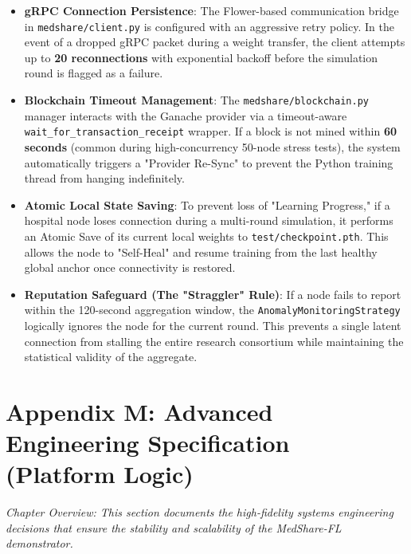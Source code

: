 \documentclass[10pt, a4paper, twocolumn]{article}
\begin{document}
\begin{itemize}[leftmargin=1.5em]
    \item \textbf{gRPC Connection Persistence}: The Flower-based communication bridge in \texttt{medshare/client.py} is configured with an aggressive retry policy. In the event of a dropped gRPC packet during a weight transfer, the client attempts up to \textbf{20 reconnections} with exponential backoff before the simulation round is flagged as a failure.
    \item \textbf{Blockchain Timeout Management}: The \texttt{medshare/blockchain.py} manager interacts with the Ganache provider via a timeout-aware \texttt{wait\_for\_transaction\_receipt} wrapper. If a block is not mined within \textbf{60 seconds} (common during high-concurrency 50-node stress tests), the system automatically triggers a "Provider Re-Sync" to prevent the Python training thread from hanging indefinitely.
    \item \textbf{Atomic Local State Saving}: To prevent loss of "Learning Progress," if a hospital node loses connection during a multi-round simulation, it performs an Atomic Save of its current local weights to \texttt{test/checkpoint.pth}. This allows the node to "Self-Heal" and resume training from the last healthy global anchor once connectivity is restored.
    \item \textbf{Reputation Safeguard (The "Straggler" Rule)}: If a node fails to report within the 120-second aggregation window, the \texttt{AnomalyMonitoringStrategy} logically ignores the node for the current round. This prevents a single latent connection from stalling the entire research consortium while maintaining the statistical validity of the aggregate.
\end{itemize}

\section*{Appendix M: Advanced Engineering Specification (Platform Logic)}
\textit{Chapter Overview: This section documents the high-fidelity systems engineering decisions that ensure the stability and scalability of the MedShare-FL demonstrator.}
\end{document}
